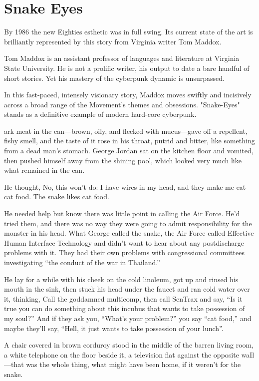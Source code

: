 \chapter{Snake Eyes}

By 1986 the new Eighties esthetic was in full swing. Its current state of the art is brilliantly represented by this story from Virginia writer Tom Maddox.

Tom Maddox is an assistant professor of languages and literature at Virginia State University. He is not a prolific writer, his output to date a bare handful of short stories. Yet his mastery of the cyberpunk dynamic is unsurpassed.

In this fast-paced, intensely visionary story, Maddox moves swiftly and incisively across a broad range of the Movement's themes and obsessions. "Snake-Eyes" stands as a definitive example of modern hard-core cyberpunk.

\hrulefill

ark meat in the can—brown, oily, and flecked with mucus—gave off a repellent, fishy smell, and the taste of it rose in his throat, putrid and bitter, like something from a dead man's stomach. George Jordan sat on the kitchen floor and vomited, then pushed himself away from the shining pool, which looked very much like what remained in the can.

He thought, No, this won't do: I have wires in my head, and they make me eat cat food. The snake likes cat food.

He needed help but know there was little point in calling the Air Force. He'd tried them, and there was no way they were going to admit responsibility for the monster in his head. What George called the snake, the Air Force called Effective Human Interface Technology and didn't want to hear about any postdischarge problems with it. They had their own problems with congressional committees investigating ``the conduct of the war in Thailand.''

He lay for a while with his cheek on the cold linoleum, got up and rinsed his mouth in the sink, then stuck his head under the faucet and ran cold water over it, thinking, Call the goddamned multicomp, then call SenTrax and say, ``Is it true you can do something about this incubus that wants to take possession of my soul?'' And if they ask you, ``What's your problem?'' you say ``cat food,'' and maybe they'll say, ``Hell, it just wants to take possession of your lunch''.

A chair covered in brown corduroy stood in the middle of the barren living room, a white telephone on the floor beside it, a television flat against the opposite waIl—that was the whole thing, what might have been home, if it weren't for the snake.

